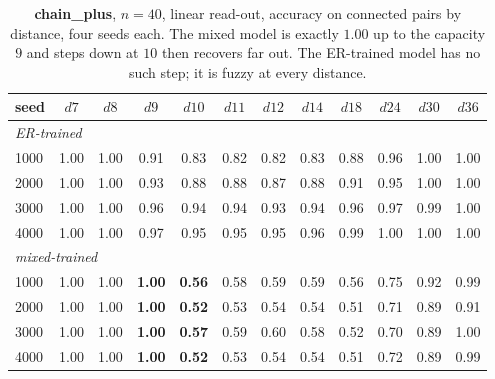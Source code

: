 \documentclass[11pt,a4paper]{article}
\begin{document}
\begin{table}[H]\centering\small
\begin{tabular}{lccccccccccc}
\toprule
seed & $d7$ & $d8$ & $d9$ & $d10$ & $d11$ & $d12$ & $d14$ & $d18$ & $d24$ & $d30$ & $d36$ \\
\midrule
\multicolumn{12}{l}{\emph{ER-trained}}\\
1000 & 1.00 & 1.00 & 0.91 & 0.83 & 0.82 & 0.82 & 0.83 & 0.88 & 0.96 & 1.00 & 1.00 \\
2000 & 1.00 & 1.00 & 0.93 & 0.88 & 0.88 & 0.87 & 0.88 & 0.91 & 0.95 & 1.00 & 1.00 \\
3000 & 1.00 & 1.00 & 0.96 & 0.94 & 0.94 & 0.93 & 0.94 & 0.96 & 0.97 & 0.99 & 1.00 \\
4000 & 1.00 & 1.00 & 0.97 & 0.95 & 0.95 & 0.95 & 0.96 & 0.99 & 1.00 & 1.00 & 1.00 \\
\midrule
\multicolumn{12}{l}{\emph{mixed-trained}}\\
1000 & 1.00 & 1.00 & \textbf{1.00} & \textbf{0.56} & 0.58 & 0.59 & 0.59 & 0.56 & 0.75 & 0.92 & 0.99 \\
2000 & 1.00 & 1.00 & \textbf{1.00} & \textbf{0.52} & 0.53 & 0.54 & 0.54 & 0.51 & 0.71 & 0.89 & 0.91 \\
3000 & 1.00 & 1.00 & \textbf{1.00} & \textbf{0.57} & 0.59 & 0.60 & 0.58 & 0.52 & 0.70 & 0.89 & 1.00 \\
4000 & 1.00 & 1.00 & \textbf{1.00} & \textbf{0.52} & 0.53 & 0.54 & 0.54 & 0.51 & 0.72 & 0.89 & 0.99 \\
\bottomrule\end{tabular}
\caption{\textbf{chain\_plus}, $n=40$, linear read-out, accuracy on connected pairs by distance,
four seeds each. The mixed model is exactly $1.00$ up to the capacity $9$ and steps down at
$10$ then recovers far out. The ER-trained model
has no such step; it is fuzzy at every distance.}
\label{tab:n40_chain_plus}
\end{table}
\end{document}
